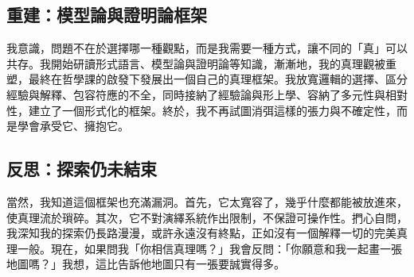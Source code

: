 \documentclass[a4paper,12pt]{article}
\begin{document}
\subsection{重建：模型論與證明論框架}
我意識，問題不在於選擇哪一種觀點，而是我需要一種方式，讓不同的「真」可以共存。我開始研讀形式語言、模型論與證明論等知識，漸漸地，我的真理觀被重塑，最終在哲學課的啟發下發展出一個自己的真理框架。我放寬邏輯的選擇、區分經驗與解釋、包容符應的不全，同時接納了經驗論與形上學、容納了多元性與相對性，建立了一個形式化的框架。終於，我不再試圖消弭這樣的張力與不確定性，而是學會承受它、擁抱它。
\subsection{反思：探索仍未結束}
當然，我知道這個框架也充滿漏洞。首先，它太寬容了，幾乎什麼都能被放進來，使真理流於瑣碎。其次，它不對演繹系統作出限制，不保證可操作性。捫心自問，我深知我的探索仍長路漫漫，或許永遠沒有終點，正如沒有一個解釋一切的完美真理一般。現在，如果問我「你相信真理嗎？」我會反問：「你願意和我一起畫一張地圖嗎？」我想，這比告訴他地圖只有一張要誠實得多。
\end{document}
